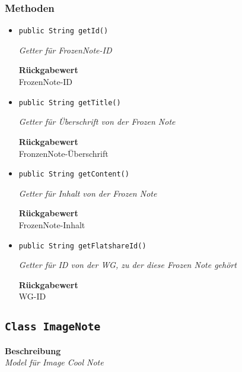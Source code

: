     \subsubsection{Methoden}
    \begin{itemize}
    	\item{\texttt{public String getId()}}
    	
    	\textit{Getter für FrozenNote-ID}
    	
    	
    	
    	\textbf{Rückgabewert} \\
    	FrozenNote-ID        \item{\texttt{public String getTitle()}}
    	
    	\textit{Getter für Überschrift von der Frozen Note}
    	
    	
    	
    	\textbf{Rückgabewert} \\
    	FronzenNote-Überschrift        \item{\texttt{public String getContent()}}
    	
    	\textit{Getter für Inhalt von der Frozen Note}
    	
    	
    	
    	\textbf{Rückgabewert} \\
    	FrozenNote-Inhalt        \item{\texttt{public String getFlatshareId()}}
    	
    	\textit{Getter für ID von der WG, zu der diese Frozen Note gehört}
    	
    	
    	
    	\textbf{Rückgabewert} \\
    	WG-ID
    \end{itemize}
    \subsection{\texttt{Class ImageNote}}
    \textbf{Beschreibung} \\
    \textit{Model für Image Cool Note}
